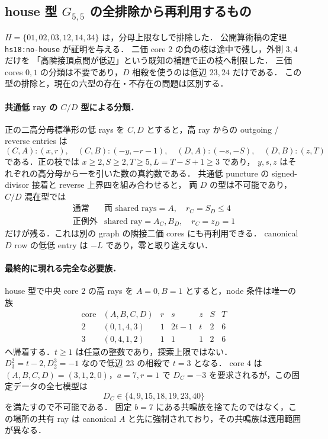 \subsection{house 型 \texorpdfstring{$G_{5,5}$}{G5,5} の全排除から再利用するもの}
\label{nh18:house}

$H=\{01,02,03,12,14,34\}$ は，分母上限なしで排除した．
公開算術稿の定理 \texttt{hs18:no-house} が証明を与える．
二価 core $2$ の負の枝は途中で残し，外側 $3,4$ だけを
「高隣接頂点間が低辺」という既知の補題で正の枝へ制限した．
三価 cores $0,1$ の分類は不要であり，$D$ 相殺を使うのは低辺 $23,24$ だけである．
この型の排除と，現在の六型の存在・不存在の問題は区別する．

\paragraph{共通低 ray の $C/D$ 型による分類．}
正の二高分母標準形の低 rays を $C,D$ とすると，高 ray からの
outgoing / reverse entries は
\[
 (C,A):(x,r),\quad(C,B):(-y,-r-1),\quad
 (D,A):(-s,-S),\quad(D,B):(z,T)
\]
である．正の枝では $x\ge2,S\ge2,T\ge5,L=T-S+1\ge3$ であり，
$y,s,z$ はそれぞれの高分母から一を引いた数の真約数である．
共通低 puncture の signed-divisor 接着と reverse 上界四を組み合わせると，
両 $D$ の型は不可能であり，$C/D$ 混在型では
\[
 \begin{array}{c|c}
 \text{通常}&\text{両 shared rays}=A,\quad r_C=S_D\le4\\
 \text{正例外}&\text{shared ray}=A_C,B_D,\quad r_C=z_D=1
 \end{array}
\]
だけが残る．これは別の graph の隣接二価 cores にも再利用できる．
canonical $D$ row の低低 entry は $-L$ であり，零と取り違えない．

\paragraph{最終的に現れる完全な必要族．}
house 型で中央 core $2$ の高 rays を $A=0,B=1$ とすると，node 条件は唯一の族
\[
 \begin{array}{c|c|ccccc}
 \text{core}&(A,B,C,D)&r&s&z&S&T\\\hline
 2&(0,1,4,3)&1&2t-1&t&2&6\\
 3&(0,4,1,2)&1&1&1&2&6
 \end{array}
\]
へ帰着する．$t\ge1$ は任意の整数であり，探索上限ではない．
$D^2_3=t-2,D^3_2=-1$ なので低辺 $23$ の相殺で $t=3$ となる．
core $4$ は $(A,B,C,D)=(3,1,2,0)$，$a=7,r=1$ で
$D_C=-3$ を要求されるが，この固定データの全七模型は
\[
 D_C\in\{4,9,15,18,19,23,40\}
\]
を満たすので不可能である．
固定 $b=7$ にある共鳴族を捨てたのではなく，この場所の共有 ray は
canonical $A$ と先に強制されており，その共鳴族は適用範囲が異なる．

